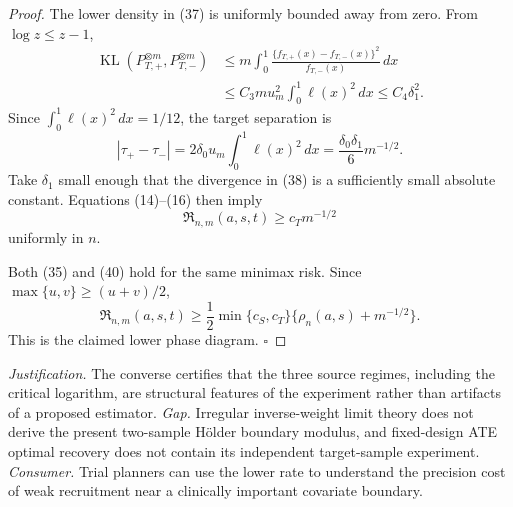 \documentclass{article}
\begin{document}
\begin{proof}
The lower density in (37) is uniformly bounded away from zero.  From \(\log z\leq z-1\),
\[
 \begin{aligned}
 \operatorname{KL}(P_{T,+}^{\otimes m},P_{T,-}^{\otimes m})
 &\leq m\int_0^1
   \frac{\{f_{T,+}(x)-f_{T,-}(x)\}^2}{f_{T,-}(x)}\,dx\\
 &\leq C_3m u_m^2\int_0^1\ell(x)^2\,dx
 \leq C_4\delta_1^2.
 \end{aligned}
 \tag{38}
\]
Since \(\int_0^1\ell(x)^2\,dx=1/12\), the target separation is
\[
 |\tau_+-\tau_-|
 =2\delta_0u_m\int_0^1\ell(x)^2\,dx
 =\frac{\delta_0\delta_1}{6}m^{-1/2}.
 \tag{39}
\]
Take \(\delta_1\) small enough that the divergence in (38) is a sufficiently small absolute constant.  Equations (14)--(16) then imply
\[
 \mathfrak R_{n,m}(a,s,t)\geq c_Tm^{-1/2}
 \tag{40}
\]
uniformly in \(n\).

Both (35) and (40) hold for the same minimax risk.  Since \(\max\{u,v\}\geq(u+v)/2\),
\[
 \mathfrak R_{n,m}(a,s,t)
 \geq \frac12\min\{c_S,c_T\}
 \{\rho_n(a,s)+m^{-1/2}\}.
\]
This is the claimed lower phase diagram. \(\square\)
\end{proof}
\par\smallskip\noindent \textit{Justification.} The converse certifies that the three source regimes, including the critical logarithm, are structural features of the experiment rather than artifacts of a proposed estimator. \textit{Gap.} Irregular inverse-weight limit theory does not derive the present two-sample H\"older boundary modulus, and fixed-design ATE optimal recovery does not contain its independent target-sample experiment. \textit{Consumer.} Trial planners can use the lower rate to understand the precision cost of weak recruitment near a clinically important covariate boundary.
\end{document}
